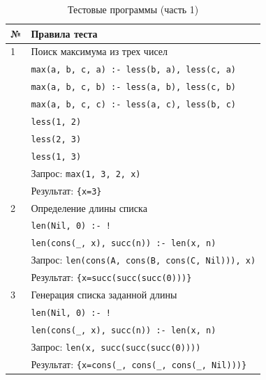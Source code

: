 \begin{table}[ht]
  \caption{Тестовые программы (часть 1)}
  \label{tbl:tests-1}
  \centering
  \begin{tabular}{|l|l|}
    \hline
    \textbf{№} & \textbf{Правила теста} \\
    \hline
    \hline
    1 & Поиск максимума из трех чисел \\
    \hline
    & \texttt{max(a, b, c, a) :- less(b, a), less(c, a)} \\
    & \texttt{max(a, b, c, b) :- less(a, b), less(c, b)} \\
    & \texttt{max(a, b, c, c) :- less(a, c), less(b, c)} \\
    & \texttt{less(1, 2)} \\
    & \texttt{less(2, 3)} \\
    & \texttt{less(1, 3)} \\
    \hline
    & Запрос: \texttt{max(1, 3, 2, x)} \\
    & Результат: \texttt{\{x=3\}} \\
    \hline
    \hline
    2 & Определение длины списка \\
    \hline
    & \texttt{len(Nil, 0) :- !} \\
    & \texttt{len(cons(\_, x), succ(n)) :- len(x, n)} \\
    \hline
    & Запрос: \texttt{len(cons(A, cons(B, cons(C, Nil))), x)} \\
    & Результат: \texttt{\{x=succ(succ(succ(0)))\}} \\
    \hline
    \hline
    3 & Генерация списка заданной длины \\
    \hline
    & \texttt{len(Nil, 0) :- !} \\
    & \texttt{len(cons(\_, x), succ(n)) :- len(x, n)} \\
    \hline
    & Запрос: \texttt{len(x, succ(succ(succ(0))))} \\
    & Результат: \texttt{\{x=cons(\_, cons(\_, cons(\_, Nil)))\}} \\
    \hline
  \end{tabular}
\end{table}

